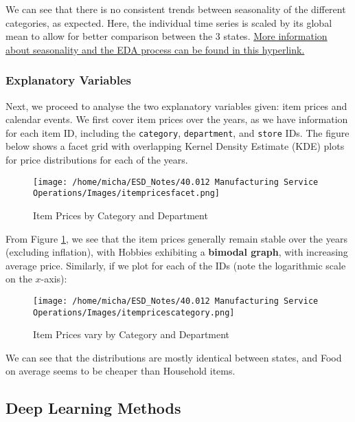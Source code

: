 \documentclass[12pt]{article}
\begin{document}
\noindent We can see that there is no consistent trends between seasonality of the different categories, as expected. Here, the individual time series is scaled by its global mean to allow for better comparison between the 3 states. \href{https://www.kaggle.com/code/headsortails/back-to-predict-the-future-interactive-m5-eda/report}{More information about seasonality and the EDA process can be found in this hyperlink.}

\subsubsection*{Explanatory Variables}

Next, we proceed to analyse the two explanatory variables given: item prices and calendar events. We first cover item prices over the years, as we have information for each item ID, including the \verb|category|, \verb|department|, and \verb|store| IDs. The figure below shows a facet grid with overlapping Kernel Density Estimate (KDE) plots for price distributions for each of the years.

\begin{figure}[H]
    \centering
    \texttt{[image: /home/micha/ESD\_Notes/40.012 Manufacturing Service Operations/Images/itempricesfacet.png]}
    \caption{Item Prices by Category and Department}
    \label{fig:6-itemprices}
\end{figure} 

\noindent From Figure \ref{fig:6-itemprices}, we see that the item prices generally remain stable over the years (excluding inflation), with Hobbies exhibiting a \textbf{bimodal graph}, with increasing average price. Similarly, if we plot for each of the IDs (note the logarithmic scale on the $x$-axis):

\begin{figure}[H]
    \centering
    \texttt{[image: /home/micha/ESD\_Notes/40.012 Manufacturing Service Operations/Images/itempricescategory.png]}
    \caption{Item Prices vary by Category and Department}
    \label{fig:6-itempricescategory}
\end{figure} 

\noindent We can see that the distributions are mostly identical between states, and Food on average seems to be cheaper than Household items. 

\subsection*{Deep Learning Methods}
\end{document}
